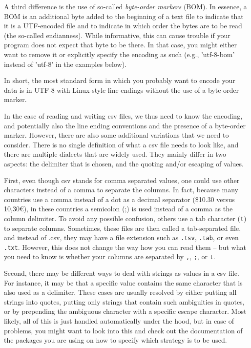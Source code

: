 A third difference is the use of so-called \emph{byte-order markers} (BOM). In essence, a BOM is an additional byte added to the beginning of a text file to indicate that it is a UTF-encoded file and to indicate in which order the bytes are to be read (the so-called endianness). While informative, this can cause trouble if your program does not expect that byte to be there. In that case, you might either want to remove it or explicitly specify the encoding as such (e.g., 'utf-8-bom' instead of 'utf-8' in the examples below).


In short, the most standard form in which you probably want to encode your data is in UTF-8 with Linux-style line endings without the use of a byte-order marker.


In the case of reading and writing csv files, we thus need to know the encoding, and potentially also the line ending conventions and the presence of a byte-order marker. However, there are also some additional variations that we need to consider. There is no single definition of what a csv file needs to look like, and there are multiple dialects that are widely used. They mainly differ in two aspects: the delimiter that is chosen, and the quoting and/or escaping of values.

First, even though csv stands for comma separated values, one could use other characters instead of a comma to separate the columns. In fact, because many countries use a comma instead of a dot  as a decimal separator (\$10.30 versus 10,30€), in these countries a semicolon (;) is used instead of a comma as the column delimiter.
To avoid any possible confusion, others use a tab character (\verb+t+) to separate columns.
Sometimes, these files are then called a tab-separated file, and instead of .csv,
they may have a file extension such as \verb|.tsv|, \verb|.tab|, or even \verb|.txt|.
However, this does not change the way how you can read them -- but what you need to know is whether your columns are separated by
\texttt{,}, \texttt{;}, or \verb|t|.

Second, there may be different ways  to deal with strings as values in a csv file. For instance, it may be that a specific value contains the same character that is also used as a delimiter. These cases are usually resolved by either putting all strings into quotes, putting only strings that contain such ambiguities in quotes, or by prepending the ambiguous character with a specific escape character. Most likely, all of this is just handled automatically under the hood, but in case of problems, you might want to look into this and check out the documentation of the packages you are using on how to specify which strategy is to be used.

